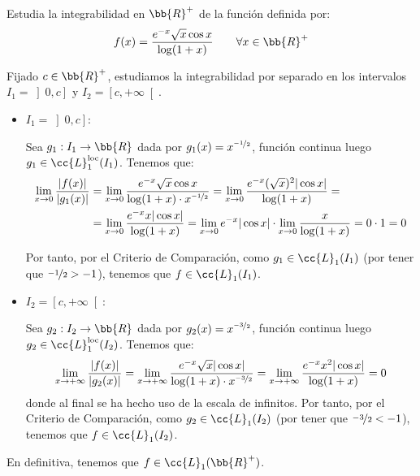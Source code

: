 \begin{ejercicio}
    Estudia la integrabilidad en $\bb{R}^+$ de la función definida por:
    \begin{equation*}
        f(x) = \dfrac{e^{-x}\sqrt{x}\cos x}{\log(1+x)} \qquad \forall x\in \bb{R}^+
    \end{equation*}

    Fijado $c\in \bb{R}^+$, estudiamos la integrabilidad por separado en los intervalos $I_1=\left]0,c\right]$ y $I_2=\left[c,+\infty\right[$.
    \begin{itemize}
        \item \ul{$I_1=\left]0,c\right]$}:
        
        Sea $g_1:I_1\to \bb{R}$ dada por $g_1(x)=x^{\nicefrac{-1}{2}}$, función continua luego $g_1\in \cc{L}_1^{\text{loc}}(I_1)$. Tenemos que:
        \begin{align*}
            \lim_{x\to 0} \dfrac{|f(x)|}{|g_1(x)|}
            &= \lim_{x\to 0} \dfrac{e^{-x}\sqrt{x}\cos x}{\log(1+x)\cdot x^{\nicefrac{-1}{2}}}
            = \lim_{x\to 0} \dfrac{e^{-x}(\sqrt{x})^2|\cos x|}{\log(1+x)}
            =\\&= \lim_{x\to 0} \dfrac{e^{-x}x|\cos x|}{\log(1+x)}
            = \lim_{x\to 0} e^{-x}|\cos x| \cdot \lim_{x\to 0} \dfrac{x}{\log(1+x)}
            = 0\cdot 1 = 0
        \end{align*}

        Por tanto, por el Criterio de Comparación, como $g_1\in \cc{L}_1(I_1)$ (por tener que $\nicefrac{-1}{2}>-1$), tenemos que $f\in \cc{L}_1(I_1)$.

        \item \ul{$I_2=\left[c,+\infty\right[$}:
        
        Sea $g_2:I_2\to \bb{R}$ dada por $g_2(x)=x^{\nicefrac{-3}{2}}$, función continua luego $g_2\in \cc{L}_1^{\text{loc}}(I_2)$. Tenemos que:
        \begin{align*}
            \lim_{x\to +\infty} \dfrac{|f(x)|}{|g_2(x)|}
            = \lim_{x\to +\infty} \dfrac{e^{-x}\sqrt{x}|\cos x|}{\log(1+x)\cdot x^{\nicefrac{-3}{2}}}
            = \lim_{x\to +\infty} \dfrac{e^{-x}x^2|\cos x|}{\log(1+x)} = 0
        \end{align*}
        donde al final se ha hecho uso de la escala de infinitos. Por tanto, por el Criterio de Comparación, como $g_2\in \cc{L}_1(I_2)$ (por tener que $\nicefrac{-3}{2}<-1$), tenemos que $f\in \cc{L}_1(I_2)$.
    \end{itemize}

    En definitiva, tenemos que $f\in \cc{L}_1(\bb{R}^+)$.
\end{ejercicio}


